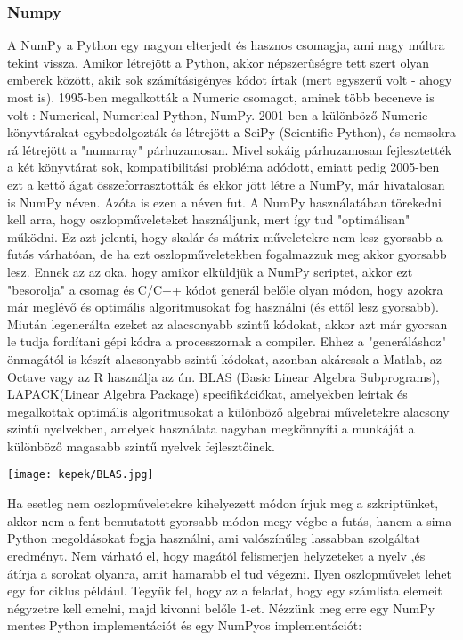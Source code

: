 \documentclass{article}
\theoremstyle{definition}
\theoremstyle{theorem}
\begin{document}
\subsubsection{Numpy}
A NumPy a Python egy nagyon elterjedt és hasznos csomagja, ami nagy múltra tekint vissza. Amikor létrejött a Python, akkor  népszerűségre tett szert olyan emberek között, akik sok számításigényes kódot írtak (mert egyszerű volt - ahogy most is). 1995-ben megalkották a Numeric csomagot, aminek több beceneve is volt : Numerical, Numerical Python, NumPy. 2001-ben a különböző Numeric könyvtárakat egybedolgozták és létrejött a SciPy (Scientific Python), és nemsokra rá létrejött a "numarray" párhuzamosan. Mivel sokáig párhuzamosan fejlesztették a két könyvtárat sok, kompatibilitási probléma adódott, emiatt pedig 2005-ben ezt a kettő ágat összeforrasztották és ekkor jött létre a NumPy, már hivatalosan is NumPy néven. Azóta is ezen a néven fut. A NumPy használatában törekedni kell arra, hogy oszlopműveleteket használjunk, mert így tud "optimálisan" működni. Ez azt jelenti, hogy skalár és mátrix műveletekre nem lesz gyorsabb a futás várhatóan, de ha ezt oszlopműveletekben fogalmazzuk meg akkor gyorsabb lesz. Ennek az az oka, hogy amikor elküldjük a NumPy scriptet, akkor ezt "besorolja" a csomag és C/C++ kódot generál belőle olyan módon, hogy azokra már meglévő és optimális algoritmusokat fog használni (és ettől lesz gyorsabb). Miután legenerálta ezeket az alacsonyabb szintű kódokat, akkor azt már gyorsan le tudja fordítani gépi kódra a processzornak a compiler. Ehhez a "generáláshoz" önmagától is készít alacsonyabb szintű kódokat, azonban akárcsak a Matlab, az Octave vagy az R használja az ún. BLAS (Basic Linear Algebra Subprograms), LAPACK(Linear Algebra Package) specifikációkat, amelyekben leírtak és megalkottak optimális algoritmusokat a különböző algebrai műveletekre alacsony szintű nyelvekben, amelyek használata nagyban megkönnyíti a munkáját a különböző magasabb szintű nyelvek fejlesztőinek.
\begin{center}
    \texttt{[image: kepek/BLAS.jpg]}
\end{center}
Ha esetleg nem oszlopműveletekre kihelyezett módon írjuk meg a szkriptünket, akkor nem a fent bemutatott gyorsabb módon megy végbe a futás, hanem a sima Python megoldásokat fogja használni, ami valószínűleg lassabban szolgáltat eredményt. Nem várható el, hogy magától felismerjen helyzeteket a nyelv ,és átírja a sorokat olyanra, amit hamarabb el tud végezni.\newline
Ilyen oszlopművelet lehet egy for ciklus például. Tegyük fel, hogy az a feladat, hogy egy számlista elemeit négyzetre kell emelni, majd kivonni belőle 1-et. Nézzünk meg erre egy NumPy mentes Python implementációt és egy NumPyos implementációt:
\end{document}
